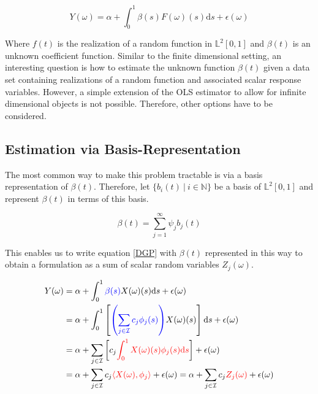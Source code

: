\documentclass[11pt,twoside,a4paper]{article}
\begin{document}
	\begin{equation}\label{DGP}
		Y(\omega) = \alpha + \int_{0}^{1} \beta(s)F(\omega)(s) \mathrm{d}s + \epsilon(\omega)
	\end{equation}
	
	Where $f(t)$ is the realization of a random function in $\mathbb{L}^2[0,1]$ and $\beta(t)$ is an unknown coefficient function. 
	Similar to the finite dimensional setting, an interesting question is how to estimate the unknown function $\beta(t)$ given a data set containing realizations of a random function and associated scalar response variables. However, a simple extension of the OLS estimator to allow for infinite dimensional objects is not possible. Therefore, other options have to be considered.
	
	\subsection{Estimation via Basis-Representation}
	The most common way to make this problem tractable is via a basis representation of $\beta(t)$. Therefore, let $\{b_i(t) \: \vert \: i \in \mathbb{N}\}$ be a basis of $\mathbb{L}^2[0,1]$ and represent $\beta(t)$ in terms of this basis.
	
	\begin{equation}
		\beta(t) = \sum_{j = 1}^{\infty} \psi_j b_j(t)
	\end{equation}
	
	This enables us to write equation \ref{DGP} with $\beta(t)$ represented in this way to obtain a formulation as a sum of scalar random variables $Z_j(\omega)$.
	
	\begin{equation}
		\begin{split}
			Y(\omega) & = \alpha + \int_{0}^{1} {\color{blue}\beta(s)} X(\omega)(s)\mathrm{d}s + \epsilon(\omega) \\
			& = \alpha + \int_{0}^{1}\left[{\color{blue}\left(\sum_{j \in \mathcal{I}} c_j \phi_j(s)\right)} X(\omega)(s) \right]\mathrm{d}s + \epsilon(\omega) \\
			& = \alpha + \sum_{j \in \mathcal{I}} \left[c_j \textcolor{red}{\int_{0}^{1} X(\omega)(s) \phi_j(s)\mathrm{d}s}\right] + \epsilon(\omega) \\
			& = \alpha + \sum_{j \in \mathcal{I}} c_j \textcolor{red}{\langle X(\omega), \phi_j \rangle} + \epsilon(\omega) 
		      = \alpha + \sum_{j \in \mathcal{I}} c_j \textcolor{red}{Z_j(\omega)} + \epsilon(\omega)
		\end{split}
	\end{equation}
	
\end{document}
